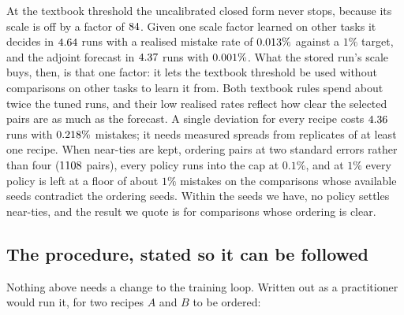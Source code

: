 At the textbook threshold the uncalibrated closed form never stops, because its scale is off by a
factor of $84$. Given one scale factor learned on other tasks it decides in
$4.64$ runs with a realised mistake rate of
$0.013\%$ against a $1\%$ target, and the adjoint forecast in
$4.37$ runs with $0.001\%$. What the stored run's
scale buys, then, is that one factor: it lets the textbook threshold be used without comparisons on
other tasks to learn it from. Both textbook rules spend about twice the tuned runs, and their low
realised rates reflect how clear the selected pairs are as much as the forecast. A single deviation
for every recipe costs $4.36$ runs with $0.218\%$
mistakes; it needs measured spreads from replicates of at least one recipe. When near-ties are
kept, ordering pairs at two standard errors rather than four ($1108$ pairs), every
policy runs into the cap at $0.1\%$, and at $1\%$ every policy is left at a floor of about $1\%$
mistakes on the comparisons whose available seeds contradict the ordering seeds. Within the seeds we
have, no policy settles near-ties, and the result we quote is for comparisons whose ordering is
clear.

\subsection{The procedure, stated so it can be followed}
\label{sec:protocol}

Nothing above needs a change to the training loop. Written out as a practitioner would run it, for
two recipes $A$ and $B$ to be ordered:

